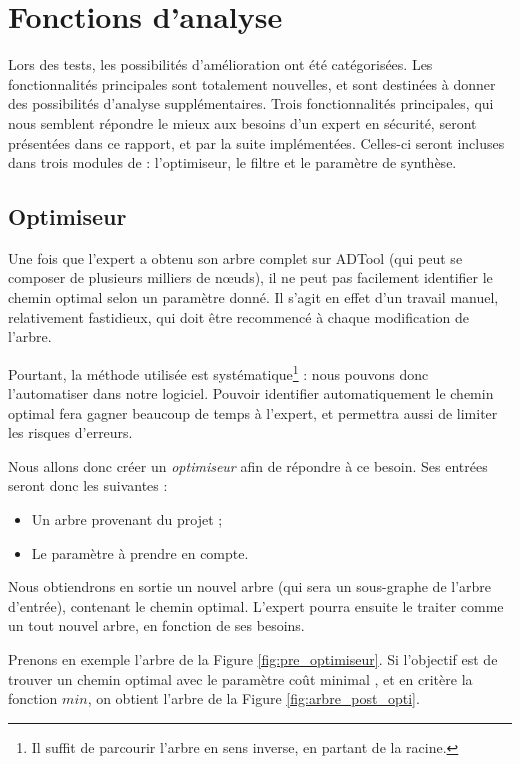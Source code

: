 \section{Fonctions d'analyse}

	Lors des tests, les possibilités d'amélioration ont été catégorisées. Les fonctionnalités principales sont totalement nouvelles, et sont destinées à donner des possibilités d'analyse supplémentaires.
	Trois fonctionnalités principales, qui nous semblent répondre le mieux aux besoins d'un expert en sécurité, seront présentées dans ce rapport, et par la suite implémentées. Celles-ci seront incluses dans trois modules de \glasir{} : l'optimiseur, le filtre et le paramètre de synthèse.

	\subsection{Optimiseur}
		\label{subsection:optimiseur}

		Une fois que l'expert a obtenu son arbre complet sur ADTool (qui peut se composer de plusieurs milliers de nœuds), il ne peut pas facilement identifier le chemin optimal selon un paramètre donné. Il s'agit en effet d'un travail manuel, relativement fastidieux, qui doit être recommencé à chaque modification de l'arbre.
		
		Pourtant, la méthode utilisée est systématique\footnote{Il suffit de parcourir l'arbre en sens inverse, en partant de la racine.} : nous pouvons donc l'automatiser dans notre logiciel. Pouvoir identifier automatiquement le chemin optimal fera gagner beaucoup de temps à l'expert, et permettra aussi de limiter les risques d'erreurs.

		Nous allons donc créer un \textit{optimiseur} afin de répondre à ce besoin.
		Ses entrées seront donc les suivantes :
		\begin{itemize}
			\item Un arbre provenant du projet ;
			\item Le paramètre à prendre en compte.
		\end{itemize}
		Nous obtiendrons en sortie un nouvel arbre (qui sera un sous-graphe de l'arbre d'entrée), contenant le chemin optimal. L'expert pourra ensuite le traiter comme un tout nouvel arbre, en fonction de ses besoins.
		
		Prenons en exemple l'arbre de la {\sc Figure} \ref{fig:pre_optimiseur}. Si l'objectif est de trouver un chemin optimal avec le paramètre \og coût minimal \fg{}, et en critère la fonction $min$, on obtient l'arbre de la {\sc Figure} \ref{fig:arbre_post_opti}.
		
